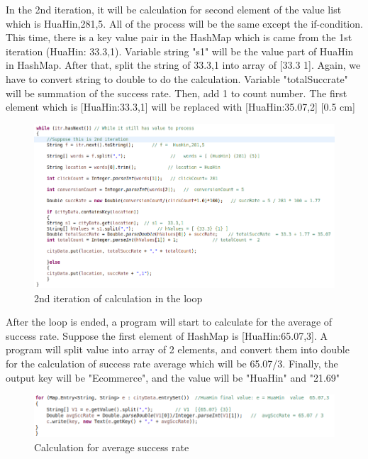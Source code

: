 \documentclass[11pt]{article}
\begin{document}
\newpage
In the 2nd iteration, it will be calculation for second element of the value list which is HuaHin,281,5. All of the process will be the same except the if-condition. This time, there is a key value pair in the HashMap which is came from the 1st iteration (HuaHin: 33.3,1). Variable string "s1" will be the value part of HuaHin in HashMap. After that, split the string of 33.3,1 into array of [{33.3} {1}]. Again, we have to convert string to double to do the calculation. Variable "totalSuccrate" will be summation of the success rate. Then, add 1 to count number. The first element which is [{HuaHin:33.3,1}] will be replaced with [{HuaHin:35.07,2}]
[0.5 cm]

\begin{figure}[h]
\centering
\includegraphics[scale=0.7]{code5}
\caption{2nd iteration of calculation in the loop}
\end{figure}


After the loop is ended, a program will start to calculate for the average of success rate. Suppose the first element of HashMap is [{HuaHin:65.07,3}]. A program will split value into array of 2 elements, and convert them into double for the calculation of success rate average which will be 65.07/3. Finally, the output key will be "Ecommerce", and the value will be "HuaHin" and "21.69"

\begin{figure}[h]
\centering
\includegraphics[scale=0.7]{code6}
\caption{Calculation for average success rate}
\end{figure}
\end{document}
